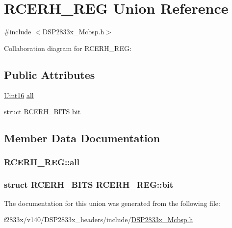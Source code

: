 \hypertarget{union_r_c_e_r_h___r_e_g}{}\section{R\+C\+E\+R\+H\+\_\+\+R\+E\+G Union Reference}
\label{union_r_c_e_r_h___r_e_g}


{\ttfamily \#include $<$D\+S\+P2833x\+\_\+\+Mcbsp.\+h$>$}



Collaboration diagram for R\+C\+E\+R\+H\+\_\+\+R\+E\+G\+:
\subsection*{Public Attributes}
\begin{DoxyCompactItemize}
\item 
\hyperlink{_d_s_p2833x___device_8h_a59a9f6be4562c327cbfb4f7e8e18f08b}{Uint16} \hyperlink{union_r_c_e_r_h___r_e_g_a9713509d92b7e177f91ecacb65401bcc}{all}
\item 
struct \hyperlink{struct_r_c_e_r_h___b_i_t_s}{R\+C\+E\+R\+H\+\_\+\+B\+I\+T\+S} \hyperlink{union_r_c_e_r_h___r_e_g_a89e7745c031dd7be7b347bc11ac7e496}{bit}
\end{DoxyCompactItemize}


\subsection{Member Data Documentation}
\hypertarget{union_r_c_e_r_h___r_e_g_a9713509d92b7e177f91ecacb65401bcc}{}
\subsubsection[{all}]{ R\+C\+E\+R\+H\+\_\+\+R\+E\+G\+::all}\label{union_r_c_e_r_h___r_e_g_a9713509d92b7e177f91ecacb65401bcc}
\hypertarget{union_r_c_e_r_h___r_e_g_a89e7745c031dd7be7b347bc11ac7e496}{}
\subsubsection[{bit}]{\setlength{\rightskip}{0pt plus 5cm}struct {\bf R\+C\+E\+R\+H\+\_\+\+B\+I\+T\+S} R\+C\+E\+R\+H\+\_\+\+R\+E\+G\+::bit}\label{union_r_c_e_r_h___r_e_g_a89e7745c031dd7be7b347bc11ac7e496}


The documentation for this union was generated from the following file\+:\begin{DoxyCompactItemize}
\item 
f2833x/v140/\+D\+S\+P2833x\+\_\+headers/include/\hyperlink{_d_s_p2833x___mcbsp_8h}{D\+S\+P2833x\+\_\+\+Mcbsp.\+h}\end{DoxyCompactItemize}
